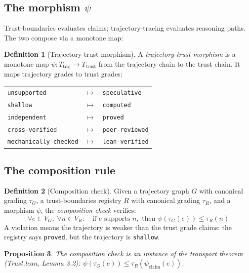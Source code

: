 \documentclass[11pt,a4paper]{article}
\theoremstyle{definition}
\newtheorem{definition}{Definition}[section]
\theoremstyle{plain}
\newtheorem{proposition}[definition]{Proposition}
\theoremstyle{remark}
\begin{document}
\subsection{The morphism $\psi$}

Trust-boundaries evaluates claims; trajectory-tracing evaluates reasoning paths. The two compose via a monotone map:

\begin{definition}[Trajectory-trust morphism]
A \emph{trajectory-trust morphism} is a monotone map $\psi : T_{\text{traj}} \to T_{\text{trust}}$ from the trajectory chain to the trust chain. It maps trajectory grades to trust grades:
\begin{center}
\begin{tabular}{lcl}
\texttt{unsupported} & $\mapsto$ & \texttt{speculative} \\
\texttt{shallow} & $\mapsto$ & \texttt{computed} \\
\texttt{independent} & $\mapsto$ & \texttt{proved} \\
\texttt{cross-verified} & $\mapsto$ & \texttt{peer-reviewed} \\
\texttt{mechanically-checked} & $\mapsto$ & \texttt{lean-verified}
\end{tabular}
\end{center}
\end{definition}

\subsection{The composition rule}

\begin{definition}[Composition check]
Given a trajectory graph $G$ with canonical grading $\tau_G$, a trust-boundaries registry $R$ with canonical grading $\tau_R$, and a morphism $\psi$, the \emph{composition check} verifies:
\[
\forall e \in V_G,\; \forall n \in V_R : \quad \text{if } e \text{ supports } n, \text{ then } \psi(\tau_G(e)) \leq \tau_R(n)
\]
A violation means the trajectory is weaker than the trust grade claims: the registry says \texttt{proved}, but the trajectory is \texttt{shallow}.
\end{definition}

\begin{proposition}
The composition check is an instance of the transport theorem (Trust.lean, Lemma 3.2): $\psi(\tau_G(e)) \leq \tau_R(\psi_{\text{claim}}(e))$.
\end{proposition}
\end{document}
